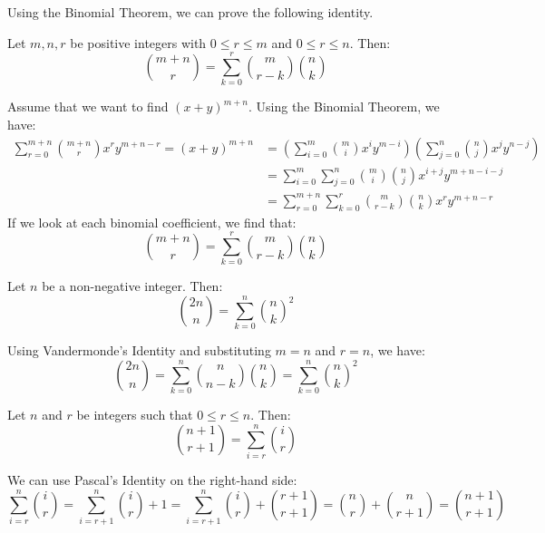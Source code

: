 \documentclass{huhtakm-template-book-v2}
\begin{document}
    Using the Binomial Theorem, we can prove the following identity.
    \begin{thm}
        Let $m,n,r$ be positive integers with $0 \leq r \leq m$ and $0 \leq r \leq n$. Then:
        \begin{equation*}
            \binom{m+n}{r} = \sum_{k = 0}^{r}\binom{m}{r-k}\binom{n}{k}
        \end{equation*}
    \end{thm}
    \begin{proofing}
        Assume that we want to find $(x+y)^{m+n}$. Using the Binomial Theorem, we have:
        \begin{align*}
            \sum_{r = 0}^{m+n}\binom{m+n}{r}x^{r}y^{m+n-r} = (x+y)^{m+n} &= \left(\sum_{i = 0}^{m}\binom{m}{i}x^{i}y^{m-i}\right)\left(\sum_{j = 0}^{n}\binom{n}{j}x^{j}y^{n-j}\right)\\
            &= \sum_{i = 0}^{m}\sum_{j = 0}^{n}\binom{m}{i}\binom{n}{j}x^{i+j}y^{m+n-i-j}\\
            \tag{Setting $r = i+j$ and $k = j$}
            &= \sum_{r = 0}^{m+n}\sum_{k = 0}^{r}\binom{m}{r-k}\binom{n}{k}x^{r}y^{m+n-r}
        \end{align*}
        If we look at each binomial coefficient, we find that:
        \begin{equation*}
            \binom{m+n}{r} = \sum_{k = 0}^{r}\binom{m}{r-k}\binom{n}{k}
        \end{equation*}
    \end{proofing}
    \begin{cor}
        Let $n$ be a non-negative integer. Then:
        \begin{equation*}
            \binom{2n}{n} = \sum_{k = 0}^{n}\binom{n}{k}^{2}
        \end{equation*}
    \end{cor}
    \begin{proofing}
        Using Vandermonde's Identity and substituting $m = n$ and $r = n$, we have:
        \begin{equation*}
            \binom{2n}{n} = \sum_{k = 0}^{n}\binom{n}{n-k}\binom{n}{k} = \sum_{k = 0}^{n}\binom{n}{k}^{2}
        \end{equation*}
    \end{proofing}
    \begin{thm}
        Let $n$ and $r$ be integers such that $0 \leq r \leq n$. Then:
        \begin{equation*}
            \binom{n+1}{r+1} = \sum_{i = r}^{n}\binom{i}{r}
        \end{equation*}
    \end{thm}
    \begin{proofing}
        We can use Pascal's Identity on the right-hand side:
        \begin{equation*}
            \sum_{i = r}^{n}\binom{i}{r} = \sum_{i = r+1}^{n}\binom{i}{r}+1 = \sum_{i = r+1}^{n}\binom{i}{r}+\binom{r+1}{r+1} = \binom{n}{r}+\binom{n}{r+1} = \binom{n+1}{r+1}
        \end{equation*}
    \end{proofing}
    \newpage
\end{document}

